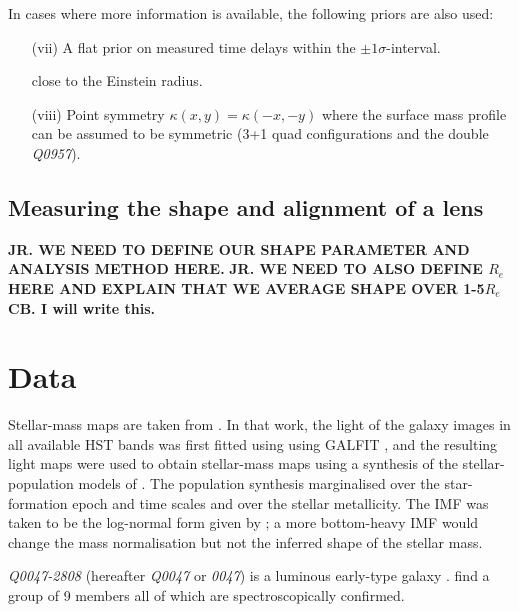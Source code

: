 \documentclass[useAMS,usenatbib]{mn2e}
\begin{document}
In cases where more information is available, the following priors are also used:

\begin{enumerate}
\item[(vii)] A flat prior on measured time delays within the $\pm 1\sigma$-interval.

close to the Einstein radius.

\item[(viii)] Point symmetry $\kappa(x,y) = \kappa(-x,-y)$ where 
the surface mass profile can be assumed to be symmetric (3+1 quad
configurations and the double \textit{Q0957}).

\end{enumerate}

\subsection{Measuring the shape and alignment of a lens}\label{sec:shapemethod}

{\bf JR. WE NEED TO DEFINE OUR SHAPE PARAMETER AND ANALYSIS METHOD HERE.} 
{\bf JR. WE NEED TO ALSO DEFINE $R_e$ HERE AND EXPLAIN THAT WE AVERAGE SHAPE OVER 1-5$R_e$} 
{\bf CB. I will write this.} 


\section{Data}\label{sec:data}

Stellar-mass maps are taken from \cite{2011ApJ...740...97L}.  In that
work, the light of the galaxy images in all available HST bands was
first fitted using using GALFIT \citep{2002AJ....124..266P}, and the
resulting light maps were used to obtain stellar-mass maps using a
synthesis of the stellar-population models of
\cite{2003MNRAS.344.1000B}.  The population synthesis marginalised
over the star-formation epoch and time scales and over the stellar
metallicity.  The IMF was taken to be the log-normal form given by
\cite{2003PASP..115..763C}; a more bottom-heavy IMF would change the
mass normalisation \citep[cf.][]{2014ApJ...793...96S} but not the
inferred shape of the stellar mass.

\textit{Q0047-2808} (hereafter \textit{Q0047} or \textit{0047}) is a luminous early-type galaxy \citep{1996MNRAS.278..139W}. \cite{2011ApJ...726...84W} find a group of 9 members all of which are spectroscopically confirmed.
\end{document}
